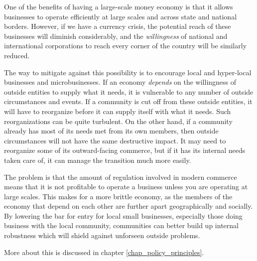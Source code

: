 \begin{policynote}
One of the benefits of having a large-scale money economy is that it
allows businesses to operate efficiently at large scales and across
state and national borders.  However, if we have a currency crisis, 
the potential reach of these businesses will diminish considerably,
and the \textit{willingness} of national and international corporations to 
reach every corner of the country will be similarly reduced.

The way to mitigate against this possibility is to encourage local and
hyper-local businesses and microbusinesses.  If an economy \textit{depends}
on the willingness of outside entities to supply what it needs, it is 
vulnerable to any number of outside circumstances and events.  If a 
community is cut off from these outside entities, it will have to reorganize
before it can supply itself with what it needs.  Such reorganizations can
be quite turbulent.  On the other hand, if a community already has
most of its needs met from its own members, then outside circumstances
will not have the same destructive impact.  It may need to reorganize
some of its outward-facing commerce, but if it has its internal needs
taken care of, it can manage the transition much more easily.

The problem is that the amount of regulation involved in modern commerce
means that it is not profitable to operate a business unless you are 
operating at large scales.  This makes for a more brittle economy, as
the members of the economy that depend on each other are further apart
geographically and socially.  By lowering the bar for entry for 
local small businesses, especially those doing business with the 
local community, communities can better build up 
internal robustness which will shield against unforseen outside problems.

More about this is discussed in chapter \ref{chap_policy_principles}.
\end{policynote}
